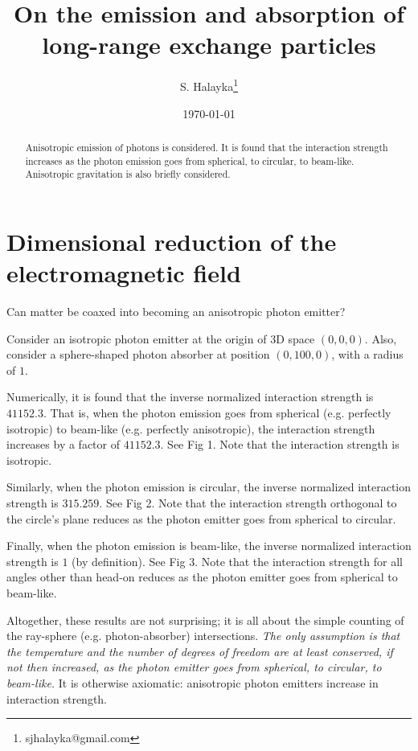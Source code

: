 \documentclass[12pt]{article}
\title{On the emission and absorption of long-range exchange particles }
\author{S. Halayka\footnote{sjhalayka@gmail.com}}
\date{\today}
\begin{document}
\maketitle

\begin{abstract}
Anisotropic emission of photons is considered.
It is found that the interaction strength increases as the photon emission goes from spherical, to circular, to beam-like.
Anisotropic gravitation is also briefly considered.
\end{abstract}



\section{Dimensional reduction of the electromagnetic field}

Can matter be coaxed into becoming an anisotropic photon emitter?

Consider an isotropic photon emitter at the origin of 3D space $(0, 0, 0)$.
Also, consider a sphere-shaped photon absorber at position $(0, 100, 0)$, with a radius of $1$.

Numerically, it is found that the inverse normalized interaction strength is $41152.3$.
That is, when the photon emission goes from spherical (e.g. perfectly isotropic) to beam-like (e.g. perfectly anisotropic), the interaction strength increases by a factor of $41152.3$.
See Fig 1.
Note that the interaction strength is isotropic.

Similarly, when the photon emission is circular, the inverse normalized interaction strength is $315.259$.
See Fig 2.
Note that the interaction strength orthogonal to the circle's plane reduces as the photon emitter goes from spherical to circular.

Finally, when the photon emission is beam-like, the inverse normalized interaction strength is $1$ (by definition).
See Fig 3.
Note that the interaction strength for all angles other than head-on reduces as the photon emitter goes from spherical to beam-like.

Altogether, these results are not surprising; it is all about the simple counting of the ray-sphere (e.g. photon-absorber) intersections.
{\textit{The only assumption is that the temperature and the number of degrees of freedom are at least conserved, if not then increased, as the photon emitter goes from spherical, to circular, to beam-like.}}
It is otherwise axiomatic: anisotropic photon emitters increase in interaction strength.
\end{document}
